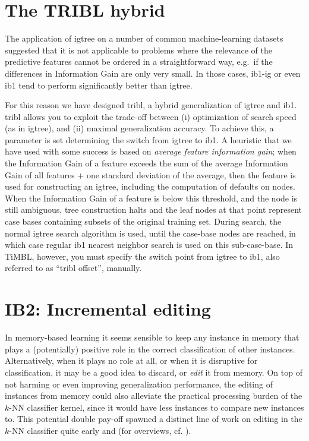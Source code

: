 \documentclass{report}
\begin{document}
\section{The TRIBL hybrid}
\label{tribl}

The application of {\sc igtree} on a number of common machine-learning
datasets suggested that it is not applicable to problems where the
relevance of the predictive features cannot be ordered in a
straightforward way, e.g.~if the differences in Information Gain are
only very small. In those cases, {\sc ib1-ig} or even {\sc ib1} tend
to perform significantly better than {\sc igtree}.

For this reason we have designed {\sc tribl}, a hybrid generalization
of {\sc igtree} and {\sc ib1}. {\sc tribl} allows you to exploit the
trade-off between (i) optimization of search speed (as in {\sc
igtree}), and (ii) maximal generalization accuracy. To achieve this, a
parameter is set determining the switch from {\sc igtree} to {\sc
ib1}. A heuristic that we have used with some success is based on {\em
average feature information gain}; when the Information Gain of a
feature exceeds the sum of the average Information Gain of all
features $+$ one standard deviation of the average, then the feature
is used for constructing an {\sc igtree}, including the computation of
defaults on nodes. When the Information Gain of a feature is below
this threshold, and the node is still ambiguous, tree construction
halts and the leaf nodes at that point represent case bases containing
subsets of the original training set. During search, the normal {\sc
igtree} search algorithm is used, until the case-base nodes are
reached, in which case regular {\sc ib1} nearest neighbor search is
used on this sub-case-base. In TiMBL, however, you must specify the
switch point from {\sc igtree} to {\sc ib1}, also referred to as
``{\sc tribl} offset'', manually.

\section{IB2: Incremental editing}
\label{ib2}

In memory-based learning it seems sensible to keep any instance in
memory that plays a (potentially) positive role in the correct
classification of other instances. Alternatively, when it plays no
role at all, or when it is disruptive for classification, it may be a
good idea to discard, or {\em edit} it from memory. On top of not
harming or even improving generalization performance, the editing of
instances from memory could also alleviate the practical processing
burden of the $k$-NN classifier kernel, since it would have less
instances to compare new instances to. This potential double pay-off
spawned a distinct line of work on editing in the $k$-NN classifier
quite early  and 
(for overviews, cf. ).
\end{document}
